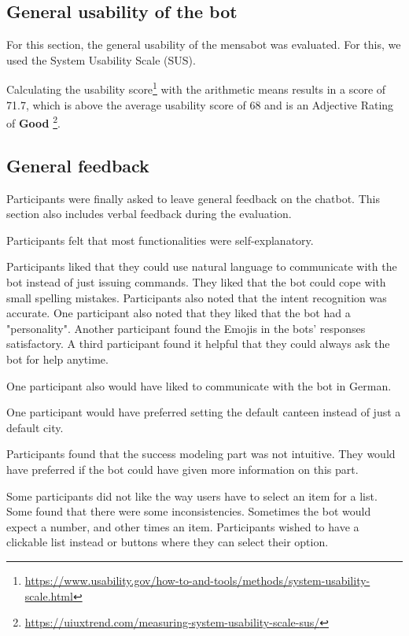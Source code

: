 \subsection{General usability of the bot}
For this section, the general usability of the mensabot was evaluated. For this, we used the System Usability Scale (SUS).

Calculating the usability score\footnote{\label{note1}\url{https://www.usability.gov/how-to-and-tools/methods/system-usability-scale.html}} with the arithmetic means results in a score of 71.7, which is above the average usability score of 68 and is an Adjective Rating of \textbf{Good} \footnote{\url{https://uiuxtrend.com/measuring-system-usability-scale-sus/}}.




\subsection{General feedback}
Participants were finally asked to leave general feedback on the chatbot. This section also includes verbal feedback during the evaluation. 

Participants felt that most functionalities were self-explanatory. 

Participants liked that they could use natural language to communicate with the bot instead of just issuing commands.
They liked that the bot could cope with small spelling mistakes.
Participants also noted that the intent recognition was accurate.
One participant also noted that they liked that the bot had a "personality". Another participant found the Emojis in the bots' responses satisfactory. A third participant found it helpful that they could always ask the bot for help anytime.

One participant also would have liked to communicate with the bot in German.

One participant would have preferred setting the default canteen instead of just a default city. 

Participants found that the success modeling part was not intuitive. They would have preferred if the bot could have given more information on this part. 

Some participants did not like the way users have to select an item for a list. Some found that there were some inconsistencies. Sometimes the bot would expect a number, and other times an item. 
Participants wished to have a clickable list instead or buttons where they can select their option.

